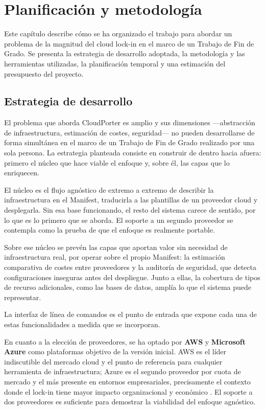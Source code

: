 \chapter{Planificación y metodología}\label{cap:planificacion}

Este capítulo describe cómo se ha organizado el trabajo para abordar un problema
de la magnitud del cloud lock-in en el marco de un Trabajo de Fin de Grado. Se
presenta la estrategia de desarrollo adoptada, la metodología y las herramientas
utilizadas, la planificación temporal y una estimación del presupuesto del proyecto.

\section{Estrategia de desarrollo}

El problema que aborda CloudPorter es amplio y sus dimensiones —abstracción de
infraestructura, estimación de costes, seguridad— no pueden desarrollarse de forma
simultánea en el marco de un Trabajo de Fin de Grado realizado por una sola persona.
La estrategia planteada consiste en construir de dentro hacia afuera: primero el
núcleo que hace viable el enfoque y, sobre él, las capas que lo enriquecen.

El núcleo es el flujo agnóstico de extremo a extremo de describir la infraestructura en
el Manifest, traducirla a las plantillas de un proveedor cloud y desplegarla. Sin esa
base funcionando, el resto del sistema carece de sentido, por lo que es lo primero
que se aborda. El soporte a un segundo proveedor se contempla como la prueba de que
el enfoque es realmente portable.

Sobre ese núcleo se prevén las capas que aportan valor sin necesidad de
infraestructura real, por operar sobre el propio Manifest: la estimación comparativa
de costes entre proveedores y la auditoría de seguridad, que detecta configuraciones
inseguras antes del despliegue. Junto a ellas, la cobertura de tipos de recurso
adicionales, como las bases de datos, amplía lo que el sistema puede representar.

La interfaz de línea de comandos es el punto de entrada que expone cada una de estas
funcionalidades a medida que se incorporan.

En cuanto a la elección de proveedores, se ha optado por \textbf{AWS} y
\textbf{Microsoft Azure} como plataformas objetivo de la versión inicial. AWS es
el líder indiscutible del mercado cloud y el punto de referencia para cualquier
herramienta de infraestructura; Azure es el segundo proveedor por cuota de mercado
y el más presente en entornos empresariales, precisamente el contexto donde el
lock-in tiene mayor impacto organizacional y económico \cite{flexera2026}. El
soporte a dos proveedores es suficiente para demostrar la viabilidad del enfoque
agnóstico.

